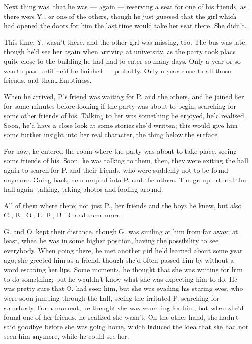 Next thing was, that he was --- again --- reserving a seat for one of his friends, as there were Y., or one of the others, though he just guessed that the girl which had opened the doors for him the last time would take her seat there. 
She didn't.

This time, Y. wasn't there, and the other girl was missing, too. The bus was late, though he'd see her again when arriving at university, as the party took place quite close to the building he had had to enter so many days. Only a year or so was to pass until he'd be finished --- probably. Only a year close to all those friends, and then\ldots Emptiness.

When he arrived, P.'s friend was waiting for P. and the others, and he joined her for some minutes before looking if the party was about to begin, searching for some other friends of his. Talking to her was something he enjoyed, he'd realized. Soon, he'd have a close look at some stories she'd written; this would give him some further insight into her real character, the thing below the surface.

For now, he entered the room where the party was about to take place, seeing some friends of his. Soon, he was talking to them, then, they were exiting the hall again to search for P. and their friends, who were suddenly not to be found anymore. Going back, he stumpled into P. and the others. The group entered the hall again, talking, taking photos and fooling around.

All of them where there; not just P., her friends and the boys he knew, but also G., B., O., L.-B., B.-B. and some more.

G. and O. kept their distance, though G. was smiling at him from far away; at least, when he was in some higher position, having the possibility to see everybody. When going there, he met another girl he'd learned about some year ago; she greeted him as a friend, though she'd often passed him by without a word escaping her lips. Some moments, he thought that she was waiting for him to do something; but he wouldn't know what she was expecting him to do. He was pretty sure that O. had seen him, but she was evading his staring eyes, who were soon jumping through the hall, seeing the irritated P. searching for somebody. For a moment, he thought she was searching for him, but when she'd found one of her friends, he realized she wasn't. On the other hand, she hadn't said goodbye before she was going home, which induced the idea that she had not seen him anymore, while he could see her.

